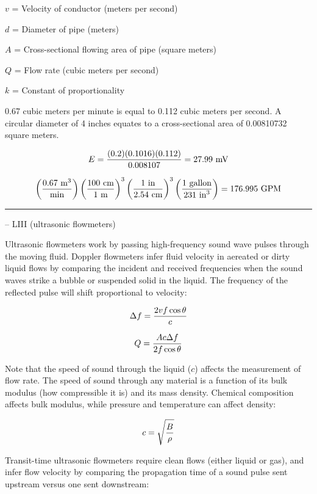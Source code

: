 $v$ = Velocity of conductor (meters per second)

$d$ = Diameter of pipe (meters)

$A$ = Cross-sectional flowing area of pipe (square meters)

$Q$ = Flow rate (cubic meters per second)

$k$ = Constant of proportionality

\vskip 10pt

0.67 cubic meters per minute is equal to 0.112 cubic meters per second.  A circular diameter of 4 inches equates to a cross-sectional area of 0.00810732 square meters.

\vskip 10pt

$$E = {(0.2) (0.1016) (0.112) \over 0.008107} = 27.99 \hbox{ mV}$$

\vskip 10pt

$$\left({0.67 \hbox{ m}^3 \over \hbox{min}}\right) \left(100 \hbox{ cm} \over 1 \hbox{ m} \right)^3 \left(1 \hbox{ in} \over 2.54 \hbox{ cm}\right)^3 \left(1 \hbox{ gallon} \over 231 \hbox{ in}^3 \right) = 176.995 \hbox{ GPM}$$


\filbreak \vskip 5pt \hrule \vskip 5pt  -- LIII (ultrasonic flowmeters) \vskip 10pt

Ultrasonic flowmeters work by passing high-frequency sound wave pulses through the moving fluid.  Doppler flowmeters infer fluid velocity in aereated or dirty liquid flows by comparing the incident and received frequencies when the sound waves strike a bubble or suspended solid in the liquid.  The frequency of the reflected pulse will shift proportional to velocity:

$$\Delta f = {{2vf \cos \theta} \over {c}}$$

$$Q = {{Ac \Delta f} \over {2 f \cos \theta}}$$

Note that the speed of sound through the liquid ($c$) affects the measurement of flow rate.  The speed of sound through any material is a function of its bulk modulus (how compressible it is) and its mass density.  Chemical composition affects bulk modulus, while pressure and temperature can affect density:

$$c = \sqrt{B \over \rho}$$

\vskip 10pt

Transit-time ultrasonic flowmeters require clean flows (either liquid or gas), and infer flow velocity by comparing the propagation time of a sound pulse sent upstream versus one sent downstream:

